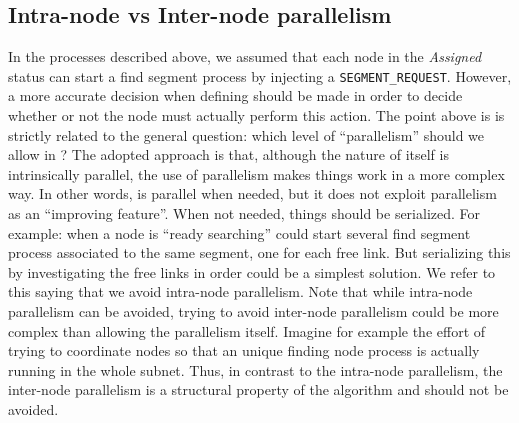 \subsection{Intra-node vs Inter-node parallelism}
In the processes described above, we assumed that each node in the
\emph{Assigned} status can start a find segment process by injecting a
\texttt{SEGMENT\_REQUEST}. However, a more accurate decision when
defining \disr{} should be made in order to decide whether or not the
node must actually perform this action.  The point above is is
strictly related to the general question: which level of “parallelism”
should we allow in \disr{} ? The adopted approach is that, although
the nature of \disr{} itself is intrinsically parallel, the use of
parallelism makes things work in a more complex way. In other words,
\disr{} is parallel when needed, but it does not exploit parallelism
as an “improving feature”. When not needed, things should be
serialized. For example: when a node is “ready searching” could start
several find segment process associated to the same segment, one for
each free link. But serializing this by investigating the free links
in order could be a simplest solution. We refer to this saying that we
avoid intra-node parallelism.  Note that while intra-node parallelism
can be avoided, trying to avoid inter-node parallelism could be more
complex than allowing the parallelism itself. Imagine for example the
effort of trying to coordinate nodes so that an unique finding node
process is actually running in the whole subnet. Thus, in contrast to
the intra-node parallelism, the inter-node parallelism is a structural
property of the \disr{} algorithm and should not be avoided.
